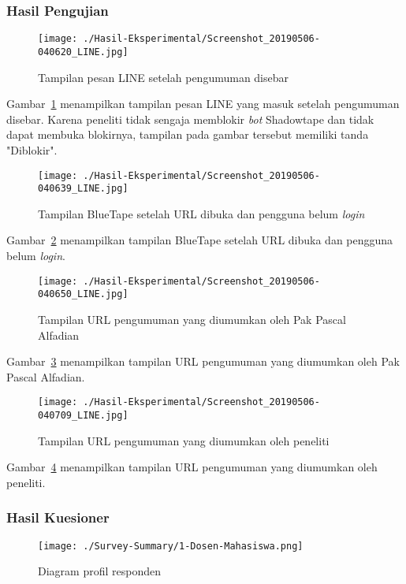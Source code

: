\subsubsection{Hasil Pengujian}
\begin{figure}[H]
	\centering  
	\texttt{[image: ./Hasil-Eksperimental/Screenshot\_20190506-040620\_LINE.jpg]}  
	\caption[Tampilan pesan LINE setelah pengumuman disebar]{Tampilan pesan LINE setelah pengumuman disebar} 
	\label{fig:eks-line} 
\end{figure}
Gambar~\ref{fig:eks-line} menampilkan tampilan pesan LINE yang masuk setelah pengumuman disebar. Karena peneliti tidak sengaja memblokir \textit{bot} Shadowtape dan tidak dapat membuka blokirnya, tampilan pada gambar tersebut memiliki tanda "Diblokir".
\begin{figure}[H]
	\centering  
	\texttt{[image: ./Hasil-Eksperimental/Screenshot\_20190506-040639\_LINE.jpg]}  
	\caption[Tampilan BlueTape setelah URL dibuka dan pengguna belum \textit{login}]{Tampilan BlueTape setelah URL dibuka dan pengguna belum \textit{login}} 
	\label{fig:eks-belum-login} 
\end{figure}
Gambar~\ref{fig:eks-belum-login} menampilkan tampilan BlueTape setelah URL dibuka dan pengguna belum \textit{login}.
\begin{figure}[H]
	\centering  
	\texttt{[image: ./Hasil-Eksperimental/Screenshot\_20190506-040650\_LINE.jpg]}  
	\caption[Tampilan URL pengumuman yang diumumkan oleh Pak Pascal Alfadian]{Tampilan URL pengumuman yang diumumkan oleh Pak Pascal Alfadian} 
	\label{fig:eks-umum1} 
\end{figure}
Gambar~\ref{fig:eks-umum1} menampilkan tampilan URL pengumuman yang diumumkan oleh Pak Pascal Alfadian.
\begin{figure}[H]
	\centering  
	\texttt{[image: ./Hasil-Eksperimental/Screenshot\_20190506-040709\_LINE.jpg]}  
	\caption[Tampilan URL pengumuman yang diumumkan oleh peneliti]{Tampilan URL pengumuman yang diumumkan oleh peneliti} 
	\label{fig:eks-umum2} 
\end{figure}
Gambar~\ref{fig:eks-umum2} menampilkan tampilan URL pengumuman yang diumumkan oleh peneliti.

\subsubsection{Hasil Kuesioner}

\begin{figure}[H]
	\centering  
	\texttt{[image: ./Survey-Summary/1-Dosen-Mahasiswa.png]}
	\caption[Diagram profil responden]{Diagram profil responden} 
	\label{fig:summary-1-Dosen-Mahasiswa} 
\end{figure}

